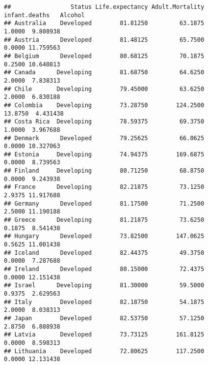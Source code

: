 \documentclass[
]{article}
\newenvironment{Shaded}{\begin{snugshade}}{\end{snugshade}}
\newcommand{\DecValTok}[1]{\textcolor[rgb]{0.00,0.00,0.81}{#1}}
\newcommand{\FunctionTok}[1]{\textcolor[rgb]{0.13,0.29,0.53}{\textbf{#1}}}
\newcommand{\NormalTok}[1]{#1}
\newcommand{\OtherTok}[1]{\textcolor[rgb]{0.56,0.35,0.01}{#1}}
\newcommand{\SpecialCharTok}[1]{\textcolor[rgb]{0.81,0.36,0.00}{\textbf{#1}}}
\begin{document}
\begin{Shaded}
\end{Shaded}

\begin{verbatim}
##                 Status Life.expectancy Adult.Mortality infant.deaths   Alcohol
## Australia    Developed        81.81250         63.1875        1.0000  9.808938
## Austria      Developed        81.48125         65.7500        0.0000 11.759563
## Belgium      Developed        80.68125         70.1875        0.2500 10.640813
## Canada      Developing        81.68750         64.6250        2.0000  7.838313
## Chile       Developing        79.45000         63.6250        2.0000  6.830188
## Colombia    Developing        73.28750        124.2500       13.8750  4.431438
## Costa Rica  Developing        78.59375         69.3750        1.0000  3.967688
## Denmark      Developed        79.25625         66.0625        0.0000 10.327063
## Estonia     Developing        74.94375        169.6875        0.0000  8.739563
## Finland     Developing        80.71250         68.8750        0.0000  9.243938
## France      Developing        82.21875         73.1250        2.9375 11.917688
## Germany      Developed        81.17500         71.2500        2.5000 11.190188
## Greece      Developing        81.21875         73.6250        0.1875  8.541438
## Hungary      Developed        73.82500        147.0625        0.5625 11.001438
## Iceland      Developed        82.44375         49.3750        0.0000  7.287688
## Ireland      Developed        80.15000         72.4375        0.0000 12.151438
## Israel      Developing        81.30000         59.5000        0.9375  2.629563
## Italy        Developed        82.18750         54.1875        2.0000  8.038313
## Japan        Developed        82.53750         57.1250        2.8750  6.888938
## Latvia       Developed        73.73125        161.8125        0.0000  8.598313
## Lithuania    Developed        72.80625        117.2500        0.0000 12.131438

\end{verbatim}
\end{document}
